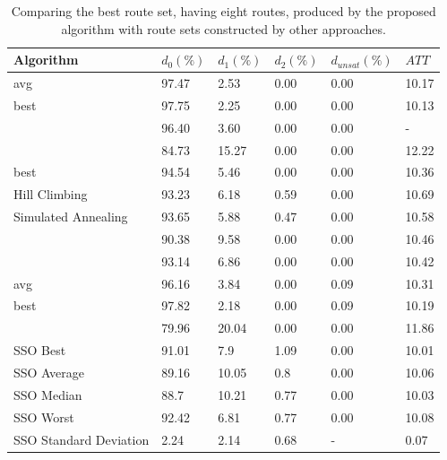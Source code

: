     \begin{table}[H]
    \centering
    \hspace*{-1.0cm}
    \begin{tabular}{|l||l|l|l|l|l|}
    \hline
    Algorithm & $d_0(\%)$ & $d_1(\%)$ & $d_2(\%)$ & $d_{unsat}(\%)$ & $ATT$ \\
    \hline
    \citet{kechagiopoulos14} avg & 97.47 & 2.53 & 0.00 & 0.00 & 10.17 \\
    \citet{kechagiopoulos14} best & 97.75 & 2.25 & 0.00 & 0.00 & 10.13 \\
    \citet{nikolic14} & 96.40 & 3.60 & 0.00 & 0.00 & - \\
    \citet{kidwai98} & 84.73 & 15.27 & 0.00 & 0.00 & 12.22 \\
    \citet{fan10} best & 94.54 & 5.46 & 0.00 & 0.00 & 10.36 \\
    \citet{fan10} Hill Climbing & 93.23 & 6.18 & 0.59 & 0.00 & 10.69 \\
    \citet{fan10} Simulated Annealing & 93.65 & 5.88 & 0.47 & 0.00 & 10.58 \\
    \citet{chakroborty02} & 90.38 & 9.58 & 0.00 & 0.00 & 10.46 \\
    \citet{zhang10} & 93.14 & 6.86 & 0.00 & 0.00 & 10.42 \\
    \citet{chew12} avg & 96.16 & 3.84 & 0.00 & 0.09 & 10.31 \\
    \citet{chew12} best & 97.82 & 2.18 & 0.00 & 0.09 & 10.19 \\
    \citet{baaj91} & 79.96 & 20.04 & 0.00 & 0.00 & 11.86 \\
    \hline
    \hline
    SSO Best & 91.01 & 7.9 & 1.09 & 0.00 & 10.01\\
    SSO Average & 89.16 & 10.05 & 0.8 & 0.00 & 10.06\\
    SSO Median & 88.7 & 10.21 & 0.77 & 0.00 & 10.03\\
    SSO Worst & 92.42 & 6.81 & 0.77 & 0.00 & 10.08\\
    SSO Standard Deviation & 2.24 & 2.14 & 0.68 & - & 0.07\\
    \hline
    \end{tabular}
    \caption {Comparing the best route set, having eight routes, produced by the proposed algorithm with route sets constructed by other approaches.}
    \label{table:performanceComparison_8}
    \end{table}


